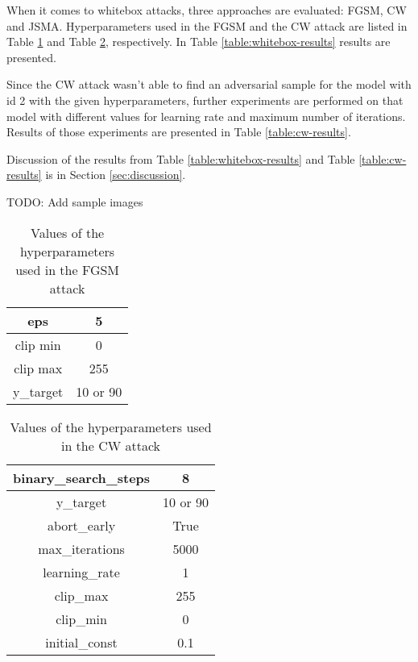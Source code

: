 When it comes to whitebox attacks, three approaches are evaluated: FGSM, CW and JSMA. Hyperparameters used in the FGSM and the CW attack are listed in Table \ref{table:fgsm-params} and Table \ref{table:cw-params}, respectively. In Table \ref{table:whitebox-results} results are presented.

Since the CW attack wasn't able to find an adversarial sample for the model with id 2 with the given hyperparameters, further experiments are performed on that model with different values for learning rate and maximum number of iterations. Results of those experiments are presented in Table \ref{table:cw-results}. 

Discussion of the results from Table  \ref{table:whitebox-results} and Table \ref{table:cw-results} is in Section \ref{sec:discussion}. 

TODO: Add sample images

\begin{table}[]
\centering
\begin{tabular}{|c|c|}
\hline
eps & 5 \\  \hline
clip min & 0  \\ \hline
clip max & 255 \\ \hline
y\_target & 10 or 90 \\ \hline
\end{tabular}
\caption{Values of the hyperparameters used in the FGSM attack}
\label{table:fgsm-params}
\end{table}

\begin{table}[]
\centering
\begin{tabular}{|c|c|}
\hline
binary\_search\_steps & 8 \\ \hline
y\_target & 10 or 90 \\ \hline
abort\_early & True \\ \hline
max\_iterations & 5000 \\ \hline
learning\_rate & 1 \\ \hline
clip\_max & 255 \\ \hline
clip\_min & 0 \\ \hline
initial\_const & 0.1 \\ \hline
\end{tabular}
\caption{Values of the hyperparameters  used in the CW attack}
\label{table:cw-params}
\end{table}

